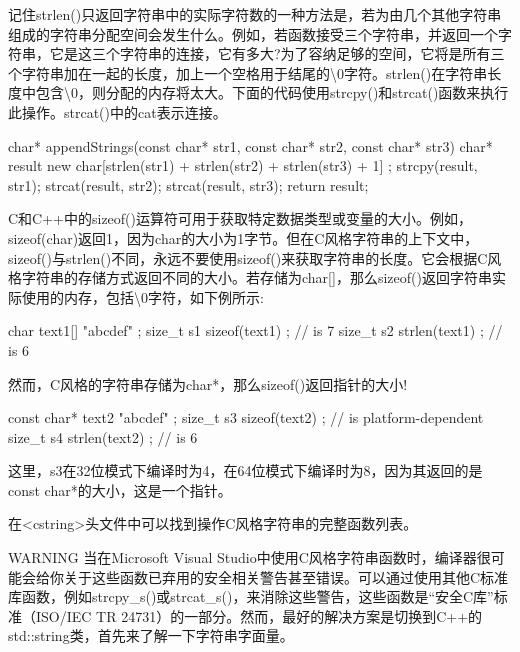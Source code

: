 记住strlen()只返回字符串中的实际字符数的一种方法是，若为由几个其他字符串组成的字符串分配空间会发生什么。例如，若函数接受三个字符串，并返回一个字符串，它是这三个字符串的连接，它有多大?为了容纳足够的空间，它将是所有三个字符串加在一起的长度，加上一个空格用于结尾的\textbackslash{}0字符。strlen()在字符串长度中包含\textbackslash{}0，则分配的内存将太大。下面的代码使用strcpy()和strcat()函数来执行此操作。strcat()中的cat表示连接。

\begin{cpp}
char* appendStrings(const char* str1, const char* str2, const char* str3)
{
    char* result { new char[strlen(str1) + strlen(str2) + strlen(str3) + 1] };
    strcpy(result, str1);
    strcat(result, str2);
    strcat(result, str3);
    return result;
}
\end{cpp}

C和C++中的sizeof()运算符可用于获取特定数据类型或变量的大小。例如，sizeof(char)返回1，因为char的大小为1字节。但在C风格字符串的上下文中，sizeof()与strlen()不同，永远不要使用sizeof()来获取字符串的长度。它会根据C风格字符串的存储方式返回不同的大小。若存储为char[]，那么sizeof()返回字符串实际使用的内存，包括\textbackslash{}0字符，如下例所示:

\begin{cpp}
char text1[] { "abcdef" };
size_t s1 { sizeof(text1) }; // is 7
size_t s2 { strlen(text1) }; // is 6
\end{cpp}

然而，C风格的字符串存储为char*，那么sizeof()返回指针的大小!

\begin{cpp}
const char* text2 { "abcdef" };
size_t s3 { sizeof(text2) }; // is platform-dependent
size_t s4 { strlen(text2) }; // is 6
\end{cpp}

这里，s3在32位模式下编译时为4，在64位模式下编译时为8，因为其返回的是const char*的大小，这是一个指针。

在<cstring>头文件中可以找到操作C风格字符串的完整函数列表。

\begin{myWarning}{WARNING}
当在Microsoft Visual Studio中使用C风格字符串函数时，编译器很可能会给你关于这些函数已弃用的安全相关警告甚至错误。可以通过使用其他C标准库函数，例如strcpy\_s()或strcat\_s()，来消除这些警告，这些函数是“安全C库”标准（ISO/IEC TR 24731）的一部分。然而，最好的解决方案是切换到C++的std::string类，首先来了解一下字符串字面量。
\end{myWarning}


